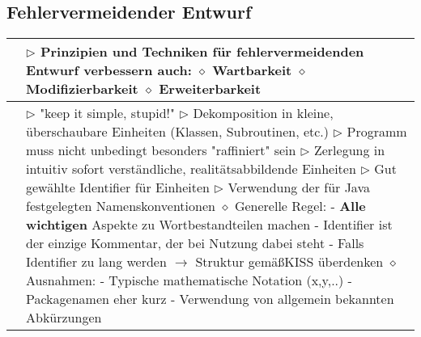 \subsection*{Fehlervermeidender Entwurf}

	\begin{longtable}{ | p{} p{} | } 
	\hline 
	
	\makecell[l]{Verbesserung} & \makecell[l]{
	$\rhd$ Prinzipien und Techniken für fehlervermeidenden Entwurf verbessern auch: \\
	\hspace{0.4cm} $\diamond$ Wartbarkeit \\
	\hspace{0.4cm} $\diamond$ Modifizierbarkeit \\
	\hspace{0.4cm} $\diamond$ Erweiterbarkeit  } \\ \hline
	
	\makecell[l]{KISS} & \makecell[l]{
	$\rhd$ \string"keep it simple, stupid!\string" \\
	$\rhd$ Dekomposition in kleine, überschaubare Einheiten (Klassen, Subroutinen, etc.) \\
	$\rhd$ Programm muss nicht unbedingt besonders \string"raffiniert\string" sein \\
	$\rhd$ Zerlegung in intuitiv sofort verständliche, realitätsabbildende Einheiten \\
	$\rhd$ Gut gewählte Identifier für Einheiten \\
	$\rhd$ Verwendung der für Java festgelegten Namenskonventionen \\
	\hspace{0.4cm} $\diamond$ Generelle Regel: \\
	\hspace{0.6cm} - \textbf{Alle wichtigen} Aspekte zu Wortbestandteilen machen \\
	\hspace{0.6cm} - Identifier ist der einzige Kommentar, der bei Nutzung dabei steht \\
	\hspace{0.6cm} - Falls Identifier zu lang werden $\rightarrow$ Struktur gemä\ss KISS überdenken \\
	\hspace{0.4cm} $\diamond$ Ausnahmen: \\
	\hspace{0.6cm} - Typische mathematische Notation (x,y,..) \\
	\hspace{0.6cm} - Packagenamen eher kurz \\
	\hspace{0.6cm} - Verwendung von allgemein bekannten Abkürzungen } \\ \hline


\end{longtable}
